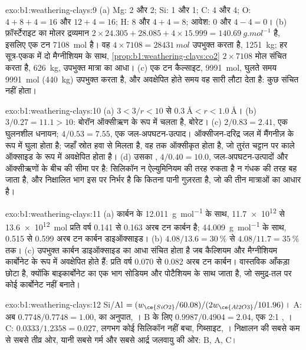 \begin{solution}{exo:b1:weathering-clays:9}
(a) Mg: 2 और 2; Si: 1 और 1; C: 4 और 4; O: $4 + 8 + 4 = 16$ और $12 + 4 =
16$; H: 8 और $4 + 4 = 8$; आवेश: 0 और $4 - 4 = 0$। (b) फ़ॉर्स्टेराइट का मोलर द्रव्यमान
$2\times24.305 + 28.085 + 4\times15.999 =
\qty{140.69}{g.mol^{-1}}$ है, इसलिए एक टन \qty{7108}{mol} है। वह $4\times7108 = \qty{28431}{mol}$  उपभुक्त करता है, \qty{1251}{kg}; हर सूत्र-एकक में दो मैग्नीशियम के साथ, \cref{prop:b1:weathering-clays:co2} $2\times7108$ मोल संचित करता है, \qty{626}{kg}, उपभुक्त मात्रा का आधा। (c) एक टन कैल्साइट, \qty{9991}{mol}, घुलते समय \qty{9991}{mol}  (\qty{440}{kg}) उपभुक्त करता है, और अवक्षेपित होते समय वह सारी लौटा देता है: कुछ संचित नहीं होता।
\end{solution}

\begin{solution}{exo:b1:weathering-clays:10}
(a) $3 < 3/r < 10$ से $\qty{0.3}{\angstrom} < r < \qty{1.0}{\angstrom}$।
(b) $3/0.27 = 11.1 > 10$: बोरॉन ऑक्सीऋण के रूप में चलता है, बोरेट। (c) $2/0.83 =
2.41$, एक घुलनशील धनायन; $4/0.53 = 7.55$, एक जल-अपघटन-उत्पाद। ऑक्सीजन-दरिद्र जल में मैंगनीज़  के रूप में घुला होता है; जहाँ स्रोत हवा से मिलता है, वह  तक ऑक्सीकृत होता है, जो तुरंत चट्टान पर काले ऑक्साइड के रूप में अवक्षेपित होता है।
(d) उसका , $4/0.40 = 10.0$, जल-अपघटन-उत्पादों और ऑक्सीऋणों के बीच की सीमा पर है: सिलिकॉन न ऐल्युमिनियम की तरह रुकता है न गंधक की तरह बह जाता है, और निक्षालित भाग इस पर निर्भर है कि कितना पानी गुज़रता है, जो  की तीन मात्राओं का आधार है।
\end{solution}

\begin{solution}{exo:b1:weathering-clays:11}
(a) कार्बन के \qty{12.011}{g.mol^{-1}} के साथ, \num{11.7e12} से
\qty{13.6e12}{mol} प्रति वर्ष 0.141 से 0.163 अरब टन कार्बन है; \qty{44.009}{g.mol^{-1}} के साथ, 0.515 से 0.599 अरब टन कार्बन डाइऑक्साइड।
(b) $4.08/13.6 = \qty{30}{\percent}$ से $4.08/11.7 = \qty{35}{\percent}$ तक।
(c) उपभुक्त कार्बन डाइऑक्साइड का आधा संचित होता है जब कैल्शियम और मैग्नीशियम कार्बोनेट के रूप में अवक्षेपित होते हैं: प्रति वर्ष 0.070 से 0.082 अरब टन कार्बन। वास्तविक आँकड़ा छोटा है, क्योंकि बाइकार्बोनेट का एक भाग सोडियम और पोटैशियम के साथ जाता है, जो समुद्र-तल पर कोई कार्बोनेट नहीं बनाते।
\end{solution}

\begin{solution}{exo:b1:weathering-clays:12}
Si/Al $= (w_{\ce{SiO2}}/60.08)/(2w_{\ce{Al2O3}}/101.96)$। A: अब $0.7748/0.7748 =
1.00$,  का अनुपात, । B के लिए $0.9987/0.4904 = 2.04$, एक 2:1 , । C: $0.0333/1.2358 = 0.027$, लगभग कोई सिलिकॉन नहीं बचा, गिब्साइट, । निक्षालन की सबसे कम से सबसे तीव्र ओर, यानी सबसे गर्म और सबसे आर्द्र जलवायु की ओर: B, A, C।
\end{solution}

